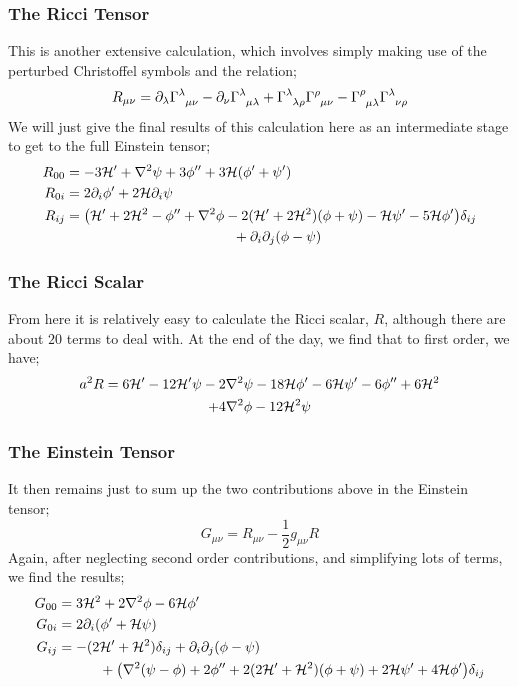 \subsubsection*{The Ricci Tensor}
This is another extensive calculation, which involves simply making use of the perturbed Christoffel symbols and the relation;
\begin{equation}
R_{\mu\nu} = \del_\lambda \Gamma\indices{^{\lambda}_{\mu\nu}} - \del_\nu \Gamma\indices{^{\lambda}_{\mu\lambda}} + \Gamma\indices{^{\lambda}_{\lambda\rho}}\Gamma\indices{^{\rho}_{\mu\nu}} - \Gamma\indices{^{\rho}_{\mu\lambda}}\Gamma\indices{^{\lambda}_{\nu\rho}}
\end{equation}
We will just give the final results of this calculation here as an intermediate stage to get to the full Einstein tensor;
\begin{align*}
R_{00} &= -3\hamilt\pr + \nabla^2 \psi + 3\phi^{\prime\prime} + 3\hamilt(\phi\pr + \psi\pr) \\
R_{0i} &= 2\del_i \phi\pr + 2\hamilt \del_i \psi \\
R_{ij} &= \left(\hamilt\pr + 2\hamilt^2 - \phi^{\prime\prime} + \nabla^2 \phi - 2(\hamilt\pr + 2\hamilt^2)(\phi + \psi) - \hamilt\psi\pr - 5\hamilt \phi\pr\right) \delta_{ij} \\
& \qquad \qquad \qquad \qquad \qquad \qquad + \del_i \del_j (\phi - \psi)
\end{align*}
\subsubsection*{The Ricci Scalar}
From here it is relatively easy to calculate the Ricci scalar, $R$, although there are about $20$ terms to deal with. At the end of the day, we find that to first order, we have;
\begin{multline*}
a^2 R = 6\mathcal{H}^{\prime} - 12\mathcal{H}^{\prime} \psi - 2\nabla^2 \psi - 18 \mathcal{H} \phi^{\prime} - 6\mathcal{H} \psi^{\prime} - 6\phi^{\prime\prime} + 6\mathcal{H}^2 \\ + 4\nabla^2 \phi - 12\mathcal{H}^2 \psi
\end{multline*}
\subsubsection*{The Einstein Tensor}
It then remains just to sum up the two contributions above in the Einstein tensor;
\begin{equation*}
G_{\mu \nu} = R_{\mu\nu} - \frac{1}{2}g_{\mu\nu}R
\end{equation*}
Again, after neglecting second order contributions, and simplifying lots of terms, we find the results;
\begin{align*}
G_{00} &= 3\hamilt^2 + 2\nabla^2 \phi - 6\hamilt \phi\pr \\
G_{0i} &= 2\del_i(\phi\pr + \hamilt \psi) \\
G_{ij} &= -(2\hamilt\pr + \hamilt^2)\delta_{ij} + \del_i \del_j (\phi - \psi) \\
&\quad \qquad+ \left(\nabla^2(\psi - \phi) + 2\phi^{\prime\prime} + 2(2\hamilt\pr + \hamilt^2)(\phi + \psi) + 2\hamilt \psi\pr + 4\hamilt \phi\pr\right)\delta_{ij}
\end{align*}
